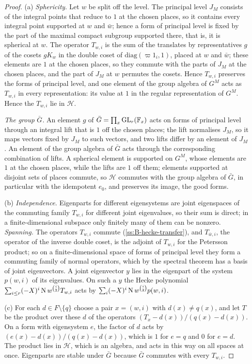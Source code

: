\begin{proof}
(a) \emph{Sphericity.} Let $w$ be split off the level. The principal level $J_M$ consists of the integral points that reduce to $1$ at the chosen places, so it contains every integral point supported at $w$ and $\bar w$; hence a form of principal level is fixed by the part of the maximal compact subgroup supported there, that is, it is spherical at $w$. The operator $T_{w,i}$ is the
sum of the translates by representatives $g$ of the cosets $gK_w$ in the double coset of $\mathrm{diag}(\varpi1_i,1)$, placed at $w$ and $\bar w$; these elements are $1$ at the chosen places, so they commute with the parts of $J_M$ at the chosen places, and the part of $J_M$ at $w$ permutes the cosets. Hence $T_{w,i}$ preserves the forms of principal level, and one element of the group algebra of $G^M$ acts
as $T_{w,i}$ in every representation: its value at $1$ in the regular representation of $G^M$. Hence the $T_{w,i}$ lie in $\mathcal H$.

\emph{The group $\bar G$.} An element $g$ of $\bar G=\prod_x\operatorname{GL}_r(\mathbb{F}_x)$ acts on forms of principal level through an integral lift that is $1$ off the chosen places; the lift normalises $J_M$, so it maps vectors fixed by $J_M$ to such vectors, and two lifts differ by an element of $J_M$. An element of the group algebra of $\bar G$ acts through the corresponding combination of lifts. A spherical element is supported on $G^M$,
whose elements are $1$ at the chosen places, while the lifts are $1$ off them; elements supported at disjoint sets of places commute, so $\mathcal H$ commutes with the group algebra of $\bar G$, in particular with the idempotent $e_0$, and preserves its image, the good forms.

(b) \emph{Independence.} Eigenparts for different eigensystems are joint eigenspaces of the commuting family $T_{w,i}$ for different joint eigenvalues, so their sum is direct; in a finite-dimensional subspace only finitely many of them can be nonzero. \emph{Spanning.} The operators $T_{w,i}$ commute (\cref{ss:B-hecke-transfer}), and $T_{\bar w,i}$, the operator of the inverse double coset, is the adjoint of $T_{w,i}$ for the Petersson product;
so on a finite-dimensional space of forms of principal level they form a commuting family of normal operators, which by the spectral theorem has a basis of joint eigenvectors. A joint eigenvector $y$ lies in the eigenpart of the system $p(w,i)$ of its eigenvalues. On such a $y$ the Hecke polynomial $\sum_{i\le r}(-X)^i\operatorname{N} w^{\binom i2}T_{w,i}$ acts by $\sum_i(-X)^i\operatorname{N} w^{\binom i2}p(w,i)$.

(c) For each $d\in F\setminus\{q\}$ choose a pair $x=(w,i)$ with $d(x)\ne q(x)$, and let $T$ be the product over these $d$ of the operators $(T_x-d(x))/(q(x)-d(x))$. On a form with eigensystem $e$, the factor of $d$ acts by $(e(x)-d(x))/(q(x)-d(x))$, which is $1$ for $e=q$ and $0$ for $e=d$. The product lies in $\mathcal H$, which is an algebra, and acts in this way on all spaces at once. Eigenparts are stable under
$\bar G$ because $\bar G$ commutes with every $T_{w,i}$.
\end{proof}

